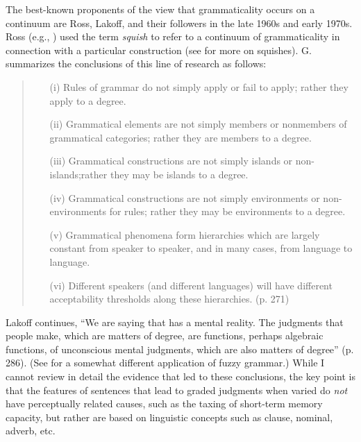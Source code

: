 The  best-known proponents of the view that grammaticality occurs on a continuum are Ross, Lakoff, and their followers in the late 1960s and early 1970s. Ross (e.g., \citeyear{Ross1972}) used the term \textit{squish} to refer to a continuum of grammaticality in connection with a particular construction (see \citet{HindleEtAl1975} for more on squishes). G. \citet{Lakoff1973} summarizes the conclusions of this line of research as follows:

\begin{quote} 
\begin{itemize}
\item[(i)] Rules of grammar do not simply apply or fail to apply; rather they apply to a degree.
 
\item[(ii)] Grammatical elements are not simply members or nonmembers of grammatical categories; rather they are members to a degree.

\item[(iii)] Grammatical constructions are not simply islands or non-is\-lands;\linebreak rather they may be islands to a degree.

\item[(iv)] Grammatical constructions are not simply environments or non-envi\-ron\-ments for rules; rather they may be environments to a degree.

\item[(v)] Grammatical phenomena form hierarchies which are largely constant from speaker to speaker, and in many cases, from language to language.

\item[(vi)] Different speakers (and different languages) will have different acceptability thresholds along these hierarchies.  (p. 271)

\end{itemize}
\end{quote}

\noindent
Lakoff continues, ``We are saying that  has a mental reality. The judgments that people make, which are matters of degree, are functions, perhaps algebraic functions, of unconscious mental judgments, which are also matters of degree'' (p. 286). (See \citet{LeveltEtAl1977} for a somewhat different application of fuzzy grammar.) While I cannot review in detail the evidence that led to these conclusions, the key point is that the features of sentences that lead to graded judgments when varied do \textit{not} have perceptually related causes, such as the taxing of short-term memory capacity, but rather are based on linguistic concepts such as clause, nominal, adverb, etc.

